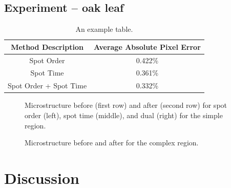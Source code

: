 \documentclass[a4paper]{article}
\begin{document}
\subsection{Experiment – oak leaf}
\label{subsec:resultleaf}

\begin{table}
\centering
\begin{tabular}{c|c}
\textbf{Method Description} & \textbf{Average Absolute Pixel Error} \\\hline
Spot Order & 0.422\% \\
Spot Time & 0.361\% \\
Spot Order + Spot Time & 0.332\%
\end{tabular}
\caption{\label{tab:resultleaf}An example table.}
\end{table}


\begin{figure}
\centering
{}
\caption{\label{fig:result50}Microstructure before (first row) and after (second row) for spot order (left), spot time (middle), and dual (right) for the simple region.}
\end{figure}

\begin{figure}
\centering
{}
\caption{\label{fig:resultleaf}Microstructure before and after for the complex region.}
\end{figure}


\section{Discussion}
\label{sec:discussion}
\end{document}
